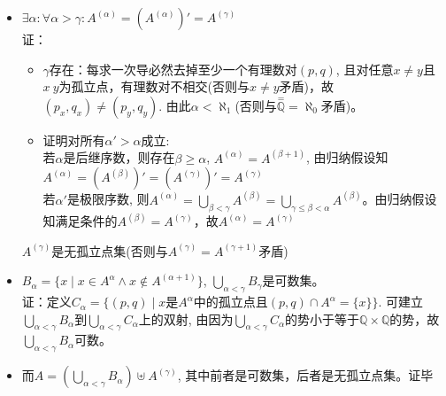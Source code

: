 \documentclass[UTF8, 9pt, a4paper]{ctexart}
\begin{document}
	\begin{itemize}
		\item $ \exists \alpha: \forall \alpha > \gamma: A^{(\alpha)} = (A^{(\alpha)})' = A^{(\gamma)}$\\
		证：
		\begin{itemize}
			\item $\gamma$存在：每求一次导必然去掉至少一个有理数对$ (p, q) $, 且对任意$ x \neq y $且$ x\ y $为孤立点，有理数对不相交(否则与$ x \neq y $矛盾)，故$ (p_x, q_x) \neq (p_y,q_y) $. 由此$ \alpha < \aleph_1 $(否则与$ \overset{=}{\mathbb{Q}} = \aleph_0 $矛盾)。
			\item 证明对所有$ \alpha' > \alpha $成立:\\
			若$ \alpha $是后继序数，则存在$ \beta \geq \alpha$, $ A^{(\alpha)} = A^{(\beta + 1)} $, 由归纳假设知$ A^{(\alpha)} = (A^{(\beta)})' = (A^{(\gamma)})' = A^{(\gamma)} $\\
			若$ \alpha' $是极限序数, 则$ A^{(\alpha)} = \bigcup_{\beta < \gamma} A^{(\beta)} = \bigcup_{\gamma \leq \beta < \alpha} A^{(\beta)}$。由归纳假设知满足条件的$ A^{(\beta)} = A^{(\gamma)} $，故$ A^{(\alpha)} = A^{(\gamma)} $
		\end{itemize}
		$ A^{(\gamma)} $是无孤立点集(否则与$ A^{(\gamma)} = A^{(\gamma + 1)} $矛盾)
		
		
		\item $ B_\alpha = \{ x \mid x \in A^{\alpha} \land x \notin A^{(\alpha + 1)} \} $, $ \bigcup\limits_{\alpha < \gamma} B_\gamma  $是可数集。\\
		证：定义$ C_\alpha = \{ (p, q) \mid x\texttt{是}A^\alpha\texttt{中的孤立点且}(p,q) \cap A^\alpha = \{ x\} \} $. 可建立$ \bigcup\limits_{\alpha < \gamma} B_\alpha  $到$\bigcup\limits_{\alpha < \gamma} C_\alpha  $上的双射, 由因为$ \bigcup\limits_{\alpha < \gamma} C_\alpha $的势小于等于$ \mathbb{Q} \times \mathbb{Q} $的势，故$ \bigcup\limits_{\alpha < \gamma} B_\alpha  $可数。
		
		\item 而$ A = (\bigcup\limits_{\alpha < \gamma} B_\alpha) \uplus A^{(\gamma)}$, 其中前者是可数集，后者是无孤立点集。证毕
	\end{itemize}
	\begin{comment}
	记$ T = \{x \mid x \in A \land x\texttt{是}A\texttt{中的孤立点}\} $
	
	
	
	分情况讨论证明如下：
	不是闭集，也不是开集的集合。$ [5, 6) \cup \{3\} $不是闭集，有孤立点。
	\begin{itemize}
		\item 对不可数且是闭集的实数集合S，由完备集定理知其是一个可数集与一个完备集的不交并，完备集属于无孤立点集合，故命题成立
		\item 对不可数且非闭集的实数集合S，开集本身没有孤立点，$ S = \emptyset \cup S $, S无孤立点集，$ \emptyset $可数，故命题成立
		\item 对可数实数集合$ S $：$ S = S \cup \emptyset $, S可数，$\emptyset$无孤立点，故命题成立
	\end{itemize}
	综上所述，命题成立
	\end{comment}
	
\end{document}
